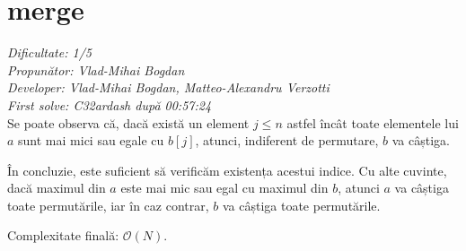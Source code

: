 \section{merge}
\textit{Dificultate: 1/5} \\
\textit{Propunător: Vlad-Mihai Bogdan} \\
\textit{Developer: Vlad-Mihai Bogdan, Matteo-Alexandru Verzotti} \\
\textit{First solve: C32ardash după 00:57:24}  \\

Se poate observa că, dacă există un element $j \leq n$ astfel încât toate elementele lui $a$ sunt mai mici sau egale cu $b[j]$, atunci, indiferent de permutare, $b$ va câștiga.

În concluzie, este suficient să verificăm existența acestui indice. Cu alte cuvinte, dacă maximul din $a$ este mai mic sau egal cu maximul din $b$, atunci $a$ va câștiga toate permutările, iar în caz contrar, $b$ va câștiga toate permutările.

\medskip

Complexitate finală: $\mathcal{O}(N)$.
